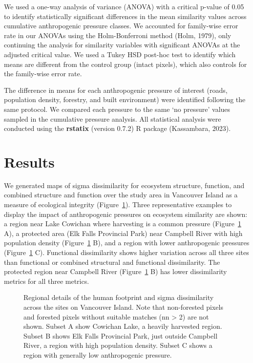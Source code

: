 \documentclass[
]{agujournal2019}
\begin{document}
We used a one-way analysis of variance (ANOVA) with a critical p-value
of 0.05 to identify statistically significant differences in the mean
similarity values across cumulative anthropogenic pressure classes. We
accounted for family-wise error rate in our ANOVAs using the
Holm-Bonferroni method (Holm, 1979), only continuing the analysis for
similarity variables with significant ANOVAs at the adjusted critical
value. We used a Tukey HSD post-hoc test to identify which means are
different from the control group (intact pixels), which also controls
for the family-wise error rate.

The difference in means for each anthropogenic pressure of interest
(roads, population density, forestry, and built environment) were
identified following the same protocol. We compared each pressure to the
same `no pressure' values sampled in the cumulative pressure analysis.
All statistical analysis were conducted using the \textbf{rstatix}
(version 0.7.2) R package (Kassambara, 2023).

\section{Results}\label{results}

We generated maps of sigma dissimilarity for ecosystem structure,
function, and combined structure and function over the study area in
Vancouver Island as a measure of ecological integrity
(Figure~\ref{fig-regional}). Three representative examples to display
the impact of anthropogenic pressures on ecosystem similarity are shown:
a region near Lake Cowichan where harvesting is a common pressure
(Figure~\ref{fig-regional} A), a protected area (Elk Falls Provincial
Park) near Campbell River with high population density
(Figure~\ref{fig-regional} B), and a region with lower anthropogenic
pressures (Figure~\ref{fig-regional} C). Functional dissimilarity shows
higher variation across all three sites than functional or combined
structural and functional dissimilarity. The protected region near
Campbell River (Figure~\ref{fig-regional} B) has lower dissimilarity
metrics for all three metrics.

\label{cell-fig-regional}
\begin{figure}[H]


\caption{\label{fig-regional}Regional details of the human footprint and
sigma dissimilarity across the sites on Vancouver Island. Note that
non-forested pixels and forested pixels without suitable matches (nn
\textgreater{} 2) are not shown. Subset A show Cowichan Lake, a heavily
harvested region. Subset B shows Elk Falls Provincial Park, just outside
Campbell River, a region with high population density. Subset C shows a
region with generally low anthropogenic pressure.}

\end{figure}%
\end{document}
